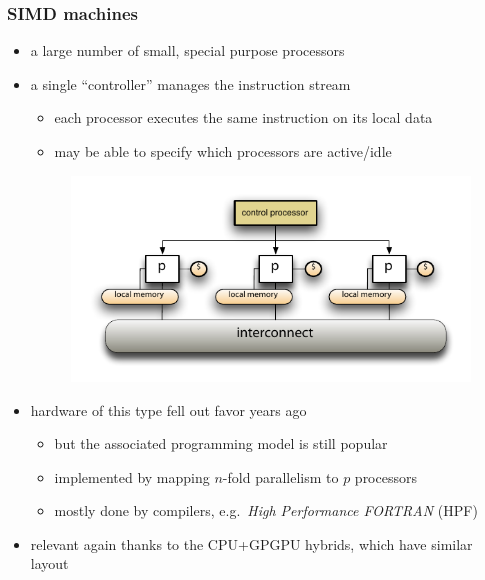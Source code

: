 \begin{frame}[fragile]
%
  \frametitle{SIMD machines}
%
  \begin{itemize}
%
  \item a large number of small, special purpose processors
%
  \item a single ``controller'' manages the instruction stream
    \begin{itemize}
      \item each processor executes the same instruction on its local data
      \item may be able  to specify which processors are active/idle
    \end{itemize}
%
  \begin{figure}
    \centering
    \includegraphics[width=.70\linewidth]{figures/simd.pdf}
    \label{fig:simd}
  \end{figure}
%
  \item hardware of this type fell out favor years ago
    \begin{itemize}
      \item but the associated programming model is still popular
      \item implemented by mapping $n$-fold parallelism to $p$ processors
      \item mostly done by compilers, e.g.~{\em High Performance FORTRAN} (HPF)
    \end{itemize}
%
  \item relevant again thanks to the CPU+GPGPU hybrids, which have similar layout
%
  \end{itemize}
%
\end{frame}

